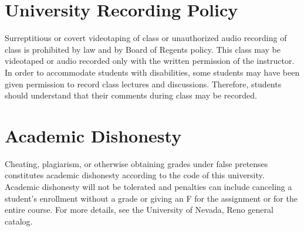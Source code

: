 \documentclass[11pt,onecolumn]{article}
\begin{document}
\section*{University Recording Policy}
Surreptitious or covert videotaping of class or unauthorized audio recording of class is prohibited by law and by Board of Regents policy. This class may be videotaped or audio recorded only with the written permission of the instructor. In order to accommodate students with disabilities, some students may have been given permission to record class lectures and discussions. Therefore, students should understand that their comments during class may be recorded.

\section*{Academic Dishonesty}
Cheating, plagiarism, or otherwise obtaining grades under false pretenses constitutes academic dishonesty according to the code of this university. Academic dishonesty will not be tolerated and penalties can include canceling a student’s enrollment without a grade or giving an F for the assignment or for the entire course. For more details, see the University of Nevada, Reno general catalog.
\end{document}
